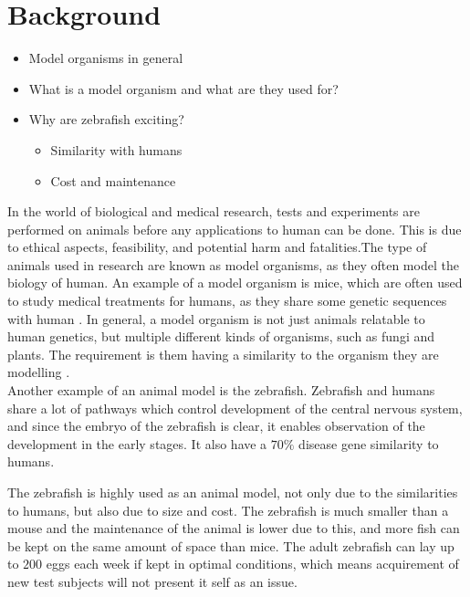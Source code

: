 \graphicspath{{figures/intro/}}
\chapter{Background}\label{ch:intro}

\begin{itemize}
	\item Model organisms in general
	\item What is a model organism and what are they used for?
	\item Why are zebrafish exciting?
	\begin{itemize}
		\item Similarity with humans
		\item Cost and maintenance
	\end{itemize}
\end{itemize}

In the world of biological and medical research, tests and experiments are performed on animals before any applications to human can be done. This is due to ethical aspects, feasibility, and potential harm and fatalities.The type of animals used in research are known as model organisms, as they often model the biology of human. An example of a model organism is mice, which are often used to study medical treatments for humans, as they share some genetic sequences with human \citep{Perlman2016, RahmanKhan2018}. 
In general, a model organism is not just animals relatable to human genetics, but multiple different kinds of organisms, such as fungi and plants. The requirement is them having a similarity to the organism they are modelling \citep{Hedges2002}.\\

Another example of an animal model is the zebrafish. Zebrafish and humans share a lot of pathways which control development of the central nervous system, and since the embryo of the zebrafish is clear, it enables observation of the development in the early stages. It also have a $70\%$ disease gene similarity to humans. 

The zebrafish is highly used as an animal model, not only due to the similarities to humans, but also due to size and cost. The zebrafish is much smaller than a mouse and the maintenance of the animal is lower due to this, and more fish can be kept on the same amount of space than mice.
The adult zebrafish can lay up to $200$ eggs each week if kept in optimal conditions, which means acquirement of new test subjects will not present it self as an issue.

